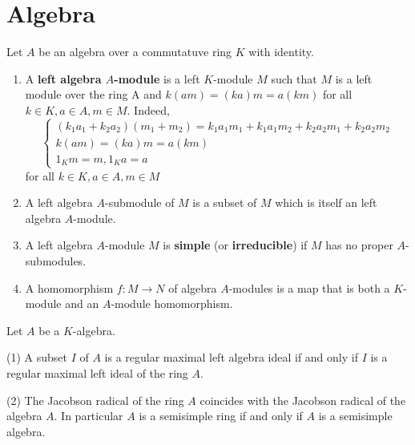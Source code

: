 \section{Algebra}
\begin{definition}
    Let $A$ be an algebra over a commutatuve ring $K$ with identity.
    \begin{enumerate}
        \item
              A \textbf{left algebra $A$-module} is a left $K$-module $M$ such that $M$ is a left module over the ring A and $k(am)=(ka) m=a(km )$ for all $k \in K, a \in A, m \in M$.
              Indeed,
              \begin{equation*}
                  \begin{cases*}
                      \left(k_1a_1+k_2a_2\right)\left(m_1+m_2\right)
                      =
                      k_1a_1m_1+k_1a_1m_2+k_2a_2m_1+k_2a_2m_2 \\
                      k(am)=(ka) m=a(km)                      \\
                      1_K m=m ,1_K a=a
                  \end{cases*}
              \end{equation*}
              for all $k \in K, a \in A, m \in M$

        \item
              A left algebra $A$-submodule of $M$ is a subset of $M$ which is itself an left algebra $A$-module.

        \item
              A left algebra $A$-module $M$ is \textbf{simple} (or \textbf{irreducible}) if $M$ has no proper $A$-submodules.

        \item
              A homomorphism $f: M \rightarrow N$ of algebra $A$-modules is a map that is both a $K$-module and an $A$-module homomorphism.
    \end{enumerate}
    \begin{remark}

    \end{remark}
\end{definition}

\begin{theorem}
    Let $A$ be a $K$-algebra.

    (1)
    A subset $I$ of $A$ is a regular maximal left algebra ideal if and only if $I$ is a regular maximal left ideal of the ring $A$.

    (2)
    The Jacobson radical of the ring $A$ coincides with the Jacobson radical of the algebra $A$.
    In particular $A$ is a semisimple ring if and only if $A$ is a semisimple algebra.
\end{theorem}



